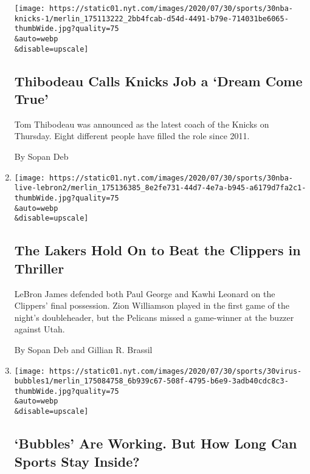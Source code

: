 \begin{enumerate}
  \texttt{[image: https://static01.nyt.com/images/2020/07/30/sports/30nba-knicks-1/merlin\_175113222\_2bb4fcab-d54d-4491-b79e-714031be6065-thumbWide.jpg?quality=75\\\&auto=webp\\\&disable=upscale]}

  \hypertarget{thibodeau-calls-knicks-job-a-dream-come-true}{%
  \subsection{Thibodeau Calls Knicks Job a `Dream Come
  True'}\label{thibodeau-calls-knicks-job-a-dream-come-true}}

  Tom Thibodeau was announced as the latest coach of the Knicks on
  Thursday. Eight different people have filled the role since 2011.

  By Sopan Deb
\item
  \href{/2020/07/30/sports/basketball/clippers-lakers.html}{}

  \texttt{[image: https://static01.nyt.com/images/2020/07/30/sports/30nba-live-lebron2/merlin\_175136385\_8e2fe731-44d7-4e7a-b945-a6179d7fa2c1-thumbWide.jpg?quality=75\\\&auto=webp\\\&disable=upscale]}

  \hypertarget{the-lakers-hold-on-to-beat-the-clippers-in-thriller}{%
  \subsection{The Lakers Hold On to Beat the Clippers in
  Thriller}\label{the-lakers-hold-on-to-beat-the-clippers-in-thriller}}

  LeBron James defended both Paul George and Kawhi Leonard on the
  Clippers' final possession. Zion Williamson played in the first game
  of the night's doubleheader, but the Pelicans missed a game-winner at
  the buzzer against Utah.

  By Sopan Deb and Gillian R. Brassil
\item
  \href{/2020/07/30/sports/basketball/sports-bubble-nba-mlb.html}{}

  \texttt{[image: https://static01.nyt.com/images/2020/07/30/sports/30virus-bubbles1/merlin\_175084758\_6b939c67-508f-4795-b6e9-3adb40cdc8c3-thumbWide.jpg?quality=75\\\&auto=webp\\\&disable=upscale]}

  \hypertarget{bubbles-are-working-but-how-long-can-sports-stay-inside}{%
  \subsection{`Bubbles' Are Working. But How Long Can Sports Stay
  Inside?}\label{bubbles-are-working-but-how-long-can-sports-stay-inside}}


\end{enumerate}
